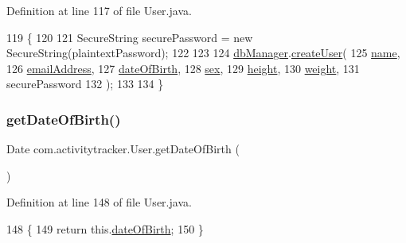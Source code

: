 Definition at line 117 of file User.\+java.


\begin{DoxyCode}
119                                                                                       \{
120 
121         SecureString securePassword = \textcolor{keyword}{new} SecureString(plaintextPassword);
122 
123 
124         \mbox{\hyperlink{classcom_1_1activitytracker_1_1_user_a8c8b36433447a235f2b4940b92e839c1}{dbManager}}.\mbox{\hyperlink{classcom_1_1activitytracker_1_1_d_b_manager_ac390a33d3547306b250c8a9ed370997c}{createUser}}(
125                 \mbox{\hyperlink{classcom_1_1activitytracker_1_1_user_a49bfb4c8ebf8b7a377df01b5f0b2d7bc}{name}},
126                 \mbox{\hyperlink{classcom_1_1activitytracker_1_1_user_ac2fdb9a858d0295e52c5f8bc179e3137}{emailAddress}},
127                 \mbox{\hyperlink{classcom_1_1activitytracker_1_1_user_a40b0d4ce16246066c0e948edef864d94}{dateOfBirth}},
128                 \mbox{\hyperlink{classcom_1_1activitytracker_1_1_user_adcbddd2e965af4e227f7cf0582a3e13d}{sex}},
129                 \mbox{\hyperlink{classcom_1_1activitytracker_1_1_user_a83cdfe6f520a4e18e8710e8e11f8c3d6}{height}},
130                 \mbox{\hyperlink{classcom_1_1activitytracker_1_1_user_a8a30c6c08983e513b462bcc035434c9e}{weight}},
131                 securePassword
132         );
133 
134     \}
\end{DoxyCode}
\mbox{\label{classcom_1_1activitytracker_1_1_user_a40da04454cea10bb5c6e6125a7a9cf64}} 
\subsubsection{\texorpdfstring{get\+Date\+Of\+Birth()}{getDateOfBirth()}}
{\footnotesize\ttfamily Date com.\+activitytracker.\+User.\+get\+Date\+Of\+Birth (\begin{DoxyParamCaption}{ }\end{DoxyParamCaption})}



Definition at line 148 of file User.\+java.


\begin{DoxyCode}
148                                  \{
149         \textcolor{keywordflow}{return} this.\mbox{\hyperlink{classcom_1_1activitytracker_1_1_user_a40b0d4ce16246066c0e948edef864d94}{dateOfBirth}};
150     \}
\end{DoxyCode}
\mbox{\label{classcom_1_1activitytracker_1_1_user_a79d69ca90216e0552ac4cae9778ea40d}} 
